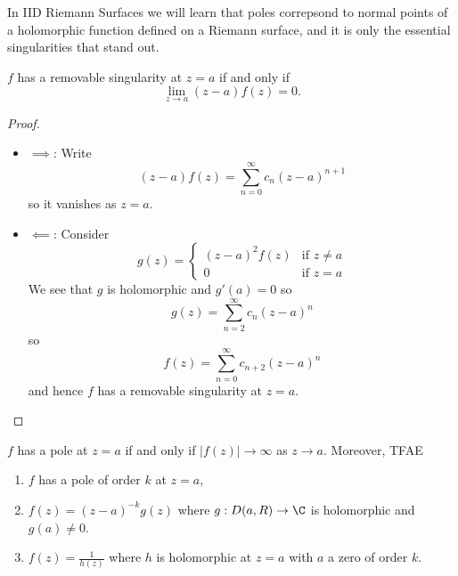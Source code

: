 \documentclass[a4paper]{article}
\begin{document}
In IID Riemann Surfaces we will learn that poles correpsond to normal points of a holomorphic function defined on a Riemann surface, and it is only the essential singularities that stand out.

\begin{proposition}
  \(f\) has a removable singularity at \(z = a\) if and only if
  \[
    \lim_{z \to a} (z - a)f(z) = 0.
  \]
\end{proposition}

\begin{proof}\leavevmode
  \begin{itemize}
  \item \(\implies\): Write
    \[
      (z - a)f(z) = \sum_{n = 0}^\infty c_n(z - a)^{n + 1}
    \]
    so it vanishes as \(z = a\).
  \item \(\impliedby\): Consider
    \[
      g(z) =
      \begin{cases}
        (z - a)^2f(z) & \text{if } z \neq a \\
        0 & \text{if } z = a
      \end{cases}
    \]
    We see that \(g\) is holomorphic and \(g'(a) = 0\) so
    \[
      g(z) = \sum_{n = 2}^\infty c_n(z -a)^n
    \]
    so
    \[
      f(z) = \sum_{n = 0}^\infty c_{n + 2}(z - a)^n
    \]
    and hence \(f\) has a removable singularity at \(z = a\).
  \end{itemize}
\end{proof}

\begin{proposition}
  \(f\) has a pole at \(z = a\) if and only if \(|f(z)| \to \infty\) as \(z \to a\). Moreover, TFAE
  \begin{enumerate}
  \item \(f\) has a pole of order \(k\) at \(z = a\),
  \item \(f(z) = (z - a)^{-k}g(z)\) where \(g: D(a, R) \to \C\) is holomorphic and \(g(a) \neq 0\).
  \item \(f(z) = \frac{1}{h(z)}\) where \(h\) is holomorphic at \(z = a\) with \(a\) a zero of order \(k\).
  \end{enumerate}
\end{proposition}
\end{document}
